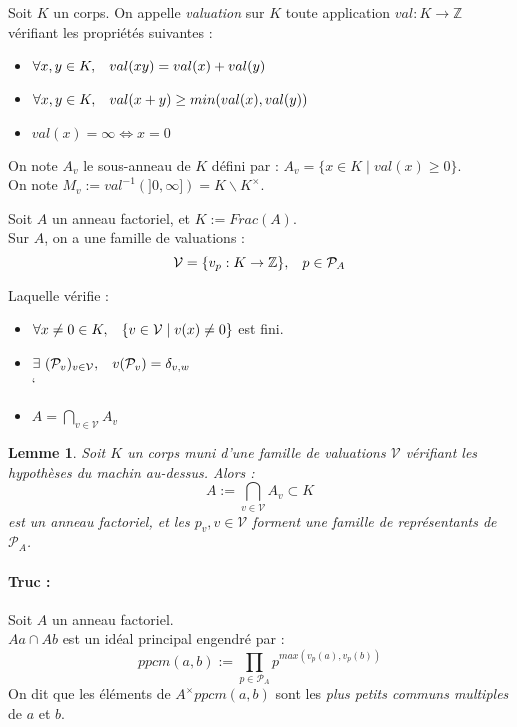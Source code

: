 \documentclass{article}           %
\newcommand\Z{\mathbb{Z}}
\newcommand\set[1]{\mathbb{#1}} 				%
\newcommand\cali[1]{\mathcal{#1}} 				%
\newcommand\prodd[2]{\underset{#1}{\overset{#2}{\prod}}} 	%
\let\dummy\exists						%
\renewcommand*{\exists}{\dummy \,}
\newcommand\tq{\hspace{0.3cm}} 		%
\theoremstyle{break}
\theoremstyle{add}
\theoremstyle{break} %
\newtheorem{lemme}{Lemme}[section]
\theoremstyle{add}
\begin{document}
Soit $K$ un corps. On appelle \textit{valuation} sur $K$ toute application $val : K \rightarrow \Z$ vérifiant les propriétés suivantes : \\
\begin{itemize}
\item $\forall x,y \in K, \tq val(xy) = val(x)+val(y)$\\
\item $\forall x,y \in K, \tq val(x+y) \geq min(val(x),val(y))$\\
\item $val(x) = \infty \Longleftrightarrow x = 0$ \\
\end{itemize}

On note $A_v$ le sous-anneau de $K$ défini par : $A_v = \{x \in K \;|\; val(x) \geq 0 \}$. \\
On note $M_v := val^{-1}(]0, \infty]) = K \backslash K^{\times}$. \\

\vspace{0.5cm}

Soit $A$ un anneau factoriel, et $K := Frac(A)$. \\
Sur $A$, on a une famille de valuations :
$$ \cali{V} = \{v_p : K \rightarrow \Z \}, \tq p \in \cali{P}_A$$

Laquelle vérifie :
\begin{itemize}
\item $\forall x \neq 0 \in K, \tq \{v \in \cali{V} \;|\; v(x) \neq 0\}$ est fini. \\
\item $\exists (\cali{P}_v)_{v \in \cali{V}}, \tq v(\cali{P}_v) = \delta_{v,w}$\\`
\item $A = \bigcap_{v \in \cali{V}} A_v$ \\
\end{itemize}

\begin{lemme}
Soit $K$ un corps muni d'une famille de valuations $\cali{V}$ vérifiant les hypothèses du machin au-dessus. Alors :
$$ A := \bigcap_{v \in \cali{V}} A_v \subset K$$
est un anneau factoriel, et les $p_v, v \in \cali{V}$ forment une famille de représentants de $\cali{P}_A$. \\
\end{lemme}

\paragraph{Truc :}
Soit $A$ un anneau factoriel. \\
$Aa \cap Ab$ est un idéal principal engendré par :
$$ ppcm(a,b) := \prodd{p \in \cali{P}_A}{} p^{max(v_p(a),v_p(b))}$$
On dit que les éléments de $A^{\times}ppcm(a,b)$ sont les \textit{plus petits communs multiples} de $a$ et $b$. \\
\end{document}
